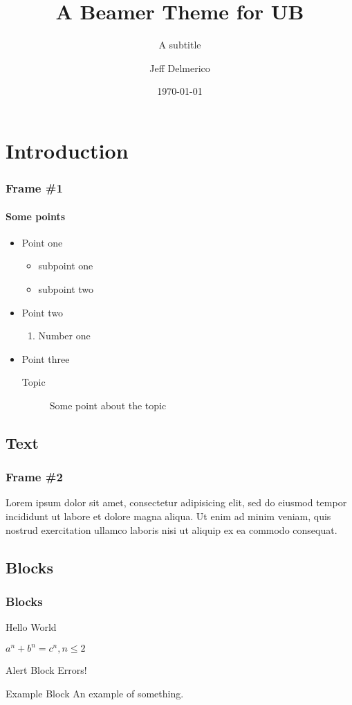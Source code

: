 \documentclass{beamer}
\title{A Beamer Theme for UB}
\subtitle{A subtitle}
\author{Jeff Delmerico}
\date{\today}
\institute{\url{jad12@buffalo.edu}}
\begin{document}
\begin{frame}[plain]
\titlepage
\end{frame}


\section{Introduction}
\begin{frame}
\frametitle{Frame \#1}
\framesubtitle{Some points}
\begin{itemize}
\item Point one
	\begin{itemize}
	\item subpoint one
	\item subpoint two
	\end{itemize}
\item Point two
	\begin{enumerate}
	\item Number one
	\end{enumerate}
\item Point three
	\begin{description}
	\item[Topic] Some point about the topic 
	\end{description}
\end{itemize}
\end{frame}

\subsection{Text}
\begin{frame}
\frametitle{Frame \#2}
Lorem ipsum dolor sit amet, consectetur adipisicing elit, sed do eiusmod tempor incididunt ut labore et dolore magna aliqua. Ut enim ad minim veniam, quis nostrud exercitation ullamco laboris nisi ut aliquip ex ea commodo consequat.
\end{frame}

\subsection{Blocks}
\begin{frame}
\frametitle{Blocks}
\begin{definition}[Greetings]
Hello World
\end{definition}

\begin{theorem}
$a^n + b^n = c^n, n \leq 2$
\end{theorem}

\begin{alertblock}{Alert Block}
Errors!
\end{alertblock}

\begin{exampleblock}{Example Block}
An example of something.
\end{exampleblock}

\end{frame}
\end{document}
